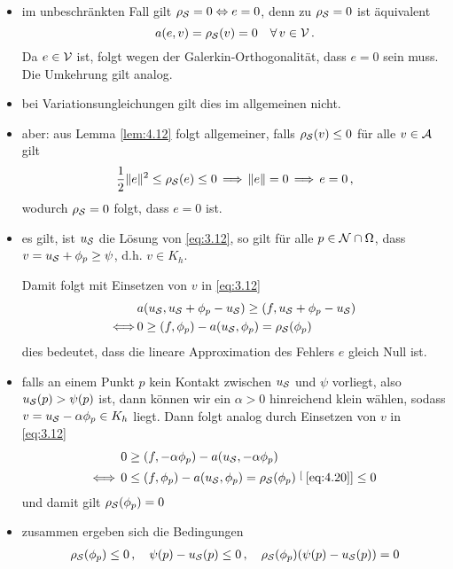 \begin{itemize}
\item im unbeschränkten Fall gilt $\rho_{\mathcal S} = 0 \Leftrightarrow e = 0$, denn zu $\rho_{\mathcal S} = 0$ ist äquivalent
\[
	a(e,v) = \rho_{\mathcal S}(v) = 0 \quad \forall \, v \in \mathcal V\, .
\]
Da $e\in \mathcal V$ ist, folgt wegen der Galerkin-Orthogonalität, dass $e=0$ sein muss. Die Umkehrung gilt analog.

\item bei Variationsungleichungen gilt dies im allgemeinen nicht.

\item aber: aus Lemma \ref{lem:4.12} folgt allgemeiner, falls $\rho_{\mathcal S} (v) \le 0$ für alle $v \in \mathcal A$ gilt
\[
	\frac 12 \lVert e\rVert^2 \le \rho_{\mathcal S}(e) \le 0\,  \Longrightarrow\,  \lVert e\rVert = 0 \, \Longrightarrow\, e = 0 \, ,
\]
wodurch $\rho_{\mathcal S} = 0$ folgt, dass $e = 0$ ist.

\item es gilt, ist $u_{\mathcal S}$ die Lösung von \eqref{eq:3.12}, so gilt für alle $p \in \mathcal N \cap \Omega$, dass $v = u_{\mathcal S} + \phi_p  \ge \psi$, d.h. $v \in K_h$.

Damit folgt mit Einsetzen von $v$ in  \eqref{eq:3.12}
\begin{align}\notag
	&a(u_{\mathcal S}, u_{\mathcal S} + \phi_p - u_{\mathcal S}) \ge (f,u_{\mathcal S}+\phi_p-u_{\mathcal S}) \\
	\label{eq:4.20}
	\Longleftrightarrow \,  & 0 \ge (f,\phi_p)-a(u_{\mathcal S},\phi_p) = \rho_{\mathcal S}(\phi_p)
\end{align}
dies bedeutet, dass die lineare Approximation des Fehlers $e$ gleich Null ist.

\item falls an einem Punkt $p$ kein Kontakt zwischen $u_{\mathcal S}$ und $\psi$ vorliegt, also $u_{\mathcal S} (p) > \psi(p)$ ist, dann können wir ein $\alpha > 0$ hinreichend klein wählen, sodass $v = u_{\mathcal S} - \alpha \phi_p \in K_h$ liegt. Dann folgt analog durch Einsetzen von $v$ in \eqref{eq:3.12}
\begin{align*}
	0 & \ge (f,-\alpha \phi_p) - a(u_{\mathcal S},-\alpha\phi_p) \\
	\Longleftrightarrow \, 0 & \le (f,\phi_p) - a(u_{\mathcal S},\phi_p) = \rho_{\mathcal S} (\phi_p) \stackrel[\scriptsize\eqref{eq:4.20}]{}\le 0
\end{align*}
und damit gilt $\rho_{\mathcal S} (\phi_p) = 0$

\item zusammen ergeben sich die Bedingungen
\begin{align}\label{eq:4.21}
	\rho_{\mathcal S} (\phi_p) \le 0 \, , \quad \psi(p)-u_{\mathcal S} (p) \le 0 \, , \quad \rho_{\mathcal S} (\phi_p) (\psi(p)-u_{\mathcal S} (p)) = 0
\end{align}


\end{itemize}
